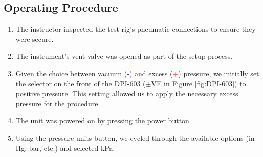 \documentclass{article}
\begin{document}
\begin{minipage}{0.5\textwidth}	
	\subsection{Operating Procedure}
	\begin{enumerate}[left=0in,itemsep=2mm]
	    \item The instructor inspected the test rig’s pneumatic connections to ensure they were secure.  
		\item The instrument’s vent valve was opened as part of the setup process.  
		\item Given the choice between vacuum (\textsf{\textcolor{blue}{-}}) and excess (\textsf{\textcolor{red}{+}}) pressure, we initially set the selector on the front of the DPI-603 ($\pm$VE in Figure \ref{fig:DPI-603}) to positive pressure. This setting allowed us to apply the necessary excess pressure for the procedure.  
		\item The unit was powered on by pressing the power button.  
		\item Using the pressure units button, we cycled through the available options (in Hg, bar, etc.) and selected kPa.  
	\end{enumerate}
\end{minipage}\hfill
\end{document}
